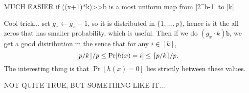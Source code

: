 MUCH EASIER if ((x+1)*k)>>b is a most uniform map from [2^b-1] to [k]

Cool trick... set $g_x\gets g_x+1$, so it is distributed in $\{1,\ldots,p\}$,
hence is it the all zeros that has smaller probability, which is useful.
Then if we do $(g_x\cdot k)\texttt b$, we get a good distribution in
the sence that for any $i \in [k]$, 
\[\lfloor {p/k} \rfloor/p\leq \Pr[h(x)=i]\leq \lceil {p/k}\rceil/p.\]
The interesting thing is that $\Pr[h(x)=0]$ lies strictly between these values.

NOT QUITE TRUE, BUT SOMETHING LIKE IT...





